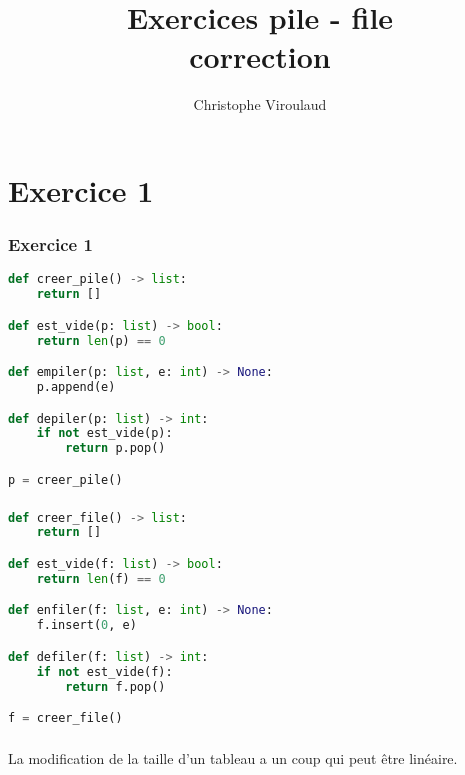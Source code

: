 \documentclass[svgnames,11pt]{beamer}
\author[]{Christophe Viroulaud}
\title{Exercices pile - file\\correction}
\date{\framebox{\textbf{Archi 06}}}
\institute{Terminale - NSI}
\begin{document}
\begin{frame}
    \titlepage
\end{frame}
\section{Exercice 1}
\begin{frame}[fragile]
    \frametitle{Exercice 1}

    \begin{center}
        \begin{lstlisting}[language=Python , basicstyle=\ttfamily\small, xleftmargin=2em, xrightmargin=2em]
def creer_pile() -> list:
    return []

def est_vide(p: list) -> bool:
    return len(p) == 0

def empiler(p: list, e: int) -> None:
    p.append(e)

def depiler(p: list) -> int:
    if not est_vide(p):
        return p.pop()

p = creer_pile()
\end{lstlisting}
        \label{CODE}
    \end{center}

\end{frame}
\begin{frame}[fragile]
    \frametitle{}

    \begin{center}
        \begin{lstlisting}[language=Python , basicstyle=\ttfamily\small, xleftmargin=2em, xrightmargin=2em]
def creer_file() -> list:
    return []

def est_vide(f: list) -> bool:
    return len(f) == 0

def enfiler(f: list, e: int) -> None:
    f.insert(0, e)

def defiler(f: list) -> int:
    if not est_vide(f):
        return f.pop()

f = creer_file()
\end{lstlisting}
        \label{CODE}
    \end{center}

\end{frame}
\begin{frame}
    \frametitle{}

    La modification de la taille d'un tableau a un coup qui peut être linéaire.

\end{frame}
\end{document}
